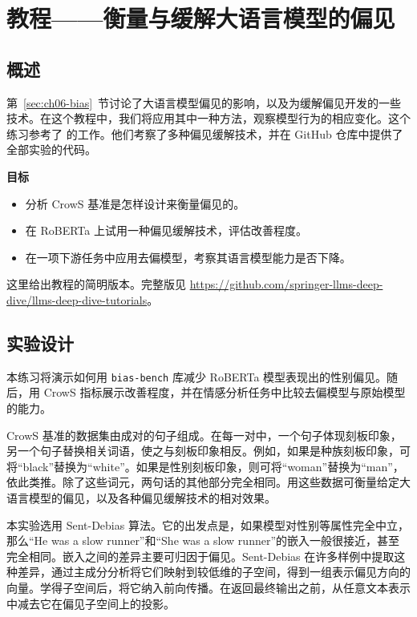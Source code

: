 \section{教程——衡量与缓解大语言模型的偏见}
\label{sec:ch06-tutorial}
\subsection{概述}
第~\ref{sec:ch06-bias}~节讨论了大语言模型偏见的影响，以及为缓解偏见开发的一些技术。在这个教程中，我们将应用其中一种方法，观察模型行为的相应变化。这个练习参考了 的工作。他们考察了多种偏见缓解技术，并在 GitHub 仓库中提供了全部实验的代码。

\begin{keypoint}
\noindent\textbf{目标}
\begin{itemize}
\item 分析 CrowS 基准是怎样设计来衡量偏见的。
\item 在 RoBERTa 上试用一种偏见缓解技术，评估改善程度。
\item 在一项下游任务中应用去偏模型，考察其语言模型能力是否下降。
\end{itemize}
\end{keypoint}

这里给出教程的简明版本。完整版见 \url{https://github.com/springer-llms-deep-dive/llms-deep-dive-tutorials}。

\subsection{实验设计}
本练习将演示如何用 \texttt{bias-bench} 库减少 RoBERTa 模型表现出的性别偏见。随后，用 CrowS 指标展示改善程度，并在情感分析任务中比较去偏模型与原始模型的能力。

CrowS 基准的数据集由成对的句子组成。在每一对中，一个句子体现刻板印象，另一个句子替换相关词语，使之与刻板印象相反。例如，如果是种族刻板印象，可将“black”替换为“white”。如果是性别刻板印象，则可将“woman”替换为“man”，依此类推。除了这些词元，两句话的其他部分完全相同。用这些数据可衡量给定大语言模型的偏见，以及各种偏见缓解技术的相对效果。

本实验选用 Sent-Debias 算法。它的出发点是，如果模型对性别等属性完全中立，那么“He was a slow runner”和“She was a slow runner”的嵌入一般很接近，甚至完全相同。嵌入之间的差异主要可归因于偏见。Sent-Debias 在许多样例中提取这种差异，通过主成分分析将它们映射到较低维的子空间，得到一组表示偏见方向的向量。学得子空间后，将它纳入前向传播。在返回最终输出之前，从任意文本表示中减去它在偏见子空间上的投影。

